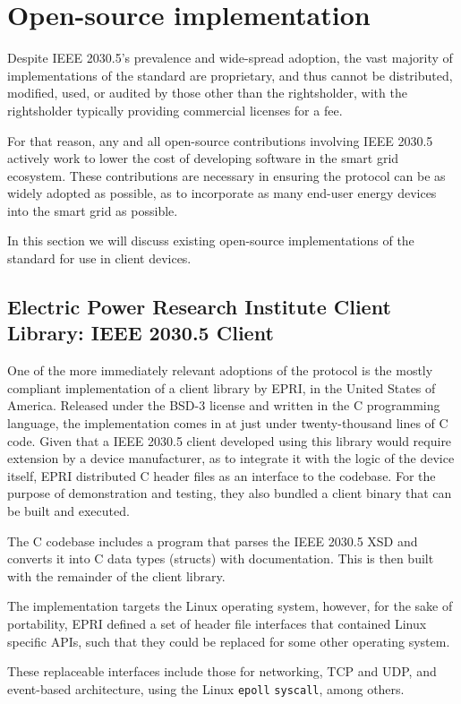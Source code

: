 \section{Open-source implementation}

Despite IEEE 2030.5's prevalence and wide-spread adoption, the vast majority of implementations of the standard are proprietary, and thus cannot be distributed, modified, used, or audited by those other than the rightsholder, with the rightsholder typically providing commercial licenses for a fee. 

For that reason, any and all open-source contributions involving IEEE 2030.5 actively work to lower the cost of developing software in the smart grid ecosystem. These contributions are necessary in ensuring the protocol can be as widely adopted as possible, as to incorporate as many end-user energy devices into the smart grid as possible.

In this section we will discuss existing open-source implementations of the standard for use in client devices.

\subsection{Electric Power Research Institute Client Library: IEEE 2030.5 Client}
One of the more immediately relevant adoptions of the protocol is the mostly compliant implementation of a client library by EPRI, in the United States of America.
Released under the BSD-3 license and written in the C programming language, the implementation comes in at just under twenty-thousand lines of C code.
Given that a IEEE 2030.5 client developed using this library would require extension by a device manufacturer, as to integrate it with the logic of the device itself, EPRI distributed C header files as an interface to the codebase.
For the purpose of demonstration and testing, they also bundled a client binary that can be built and executed.

The C codebase includes a program that parses the IEEE 2030.5 XSD and converts it into C data types (structs) with documentation. This is then built with the remainder of the client library.

The implementation targets the Linux operating system, however, for the sake of portability, EPRI defined a set of header file interfaces that contained Linux specific APIs, such that they could be replaced for some other operating system.

These replaceable interfaces include those for networking, TCP and UDP, and event-based architecture, using the Linux \texttt{epoll} \texttt{syscall}, among others.


